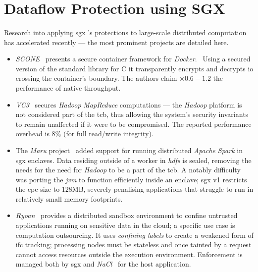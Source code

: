 \section{Dataflow Protection using SGX}
\paragraph{} Research into applying \acrshort{sgx} 's protections to large-scale distributed computation has accelerated recently --- the most prominent projects are detailed here. 

\begin{itemize}
    \item \textit{SCONE}~\cite{10.5555/3026877.3026930} presents a secure container framework for \textit{Docker}.~\cite{docker-security} Using a secured version of the standard library for C it transparently encrypts and decrypts \acrshort{io} crossing the container's boundary. The authors claim $\times 0.6-1.2$ the performance of native throughput.
    \item \textit{VC3}~\cite{vc37163017} secures \textit{Hadoop} \textit{MapReduce} computations --- the \textit{Hadoop} platform is not considered part of the \acrshort{tcb}, thus allowing the system's security invariants to remain unaffected if it were to be compromised. The reported performance overhead is 8\% (for full read/write integrity).
    \item The \textit{Maru} project~\cite{maru} added support for running distributed \textit{Apache Spark} in \acrshort{sgx} enclaves. Data residing outside of a worker in \textit{\acrshort{hdfs}} is sealed, removing the needs for the need for \textit{Hadoop} to be a part of the \acrshort{tcb}. A notably difficulty was porting the \textit{\acrshort{jvm}} to function efficiently inside an enclave; \acrshort{sgx} v1 restricts the \acrshort{epc} size to 128MB, severely penalising applications that struggle to run in relatively small memory footprints.
    \item \textit{Ryoan}~\cite{ryoan199358} provides a distributed sandbox environment to confine untrusted applications running on sensitive data in the cloud; a specific use case is computation outsourcing. It uses \textit{confining labels} to create a weakened form of \acrshort{ifc} tracking; processing nodes must be stateless and once tainted by a request cannot access resources outside the execution environment. Enforcement is managed both by \acrshort{sgx} and \textit{NaCl}~\cite{nacl} for the host application. 
\end{itemize}

